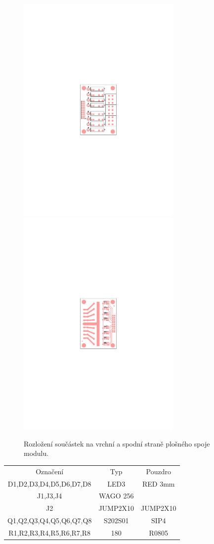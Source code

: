 \documentclass[12pt,a4paper,oneside]{article}
\begin{document}
\begin{figure} [htbp]
  \includegraphics[trim = 70mm 110mm 70mm 110mm, clip, width=8cm]{../../CAM_DOC/O1.pdf}
  \includegraphics[trim = 70mm 110mm 70mm 110mm, clip, width=8cm]{../../CAM_DOC/O2.pdf}
  \caption{Rozložení součástek na vrchní a spodní straně plošného spoje modulu.}
\end{figure}


\begin{table}
\begin{tabular}{ccc}
Označení & Typ & Pouzdro\\ 
D1,D2,D3,D4,D5,D6,D7,D8	&	LED3		&	RED 3mm \\
J1,J3,J4	 & WAGO 256 & \\ 
J2 &		JUMP2X10		& JUMP2X10 \\
Q1,Q2,Q3,Q4,Q5,Q6,Q7,Q8	& S202S01	&	SIP4 \\
R1,R2,R3,R4,R5,R6,R7,R8 & 180	&  R0805 \\
\end{tabular} 
\end{table}
\end{document}
